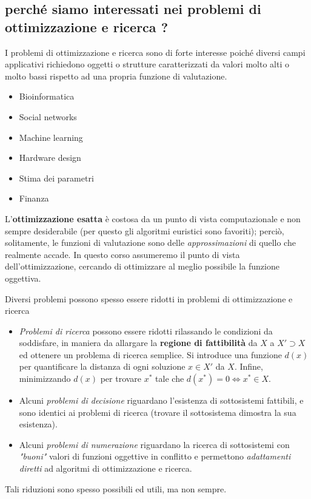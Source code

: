 \documentclass{article}
\begin{document}
\subsection{perché siamo interessati nei problemi di ottimizzazione e ricerca ?}

I problemi di ottimizzazione e ricerca sono di forte interesse poiché diversi campi applicativi richiedono oggetti o strutture caratterizzati da valori molto alti o molto bassi rispetto ad una propria funzione di valutazione.
\begin{itemize}
    \item Bioinformatica
    \item Social networks
    \item Machine learning
    \item Hardware design
    \item Stima dei parametri
    \item Finanza
\end{itemize}

L'\textbf{ottimizzazione esatta} è costosa da un punto di vista computazionale e non sempre desiderabile (per questo gli algoritmi euristici sono favoriti);
perciò, solitamente, le funzioni di valutazione sono delle \textit{approssimazioni} di quello che realmente accade. In questo corso assumeremo il punto di vista dell'ottimizzazione, cercando di ottimizzare al meglio possibile la funzione oggettiva.

Diversi problemi possono spesso essere ridotti in problemi di ottimizzazione e ricerca
\begin{itemize}
    \item \textit{Problemi di ricerca} possono essere ridotti rilassando le condizioni da soddisfare, in maniera da allargare la \textbf{regione di fattibilità}
          da $X$ a $X'\supset X$ ed ottenere un problema di ricerca semplice. Si introduce una funzione $d(x)$ per quantificare la distanza di ogni soluzione $x\in X'$ da $X$. Infine, minimizzando $d(x)$ per trovare $x^*$ tale che $d(x^*)=0 \Leftrightarrow x^* \in X$.
    \item Alcuni \textit{problemi di decisione} riguardano l'esistenza di sottosistemi fattibili, e sono identici ai problemi di
          ricerca (trovare il sottosistema dimostra la sua esistenza).
    \item Alcuni \textit{problemi di numerazione} riguardano la ricerca di sottosistemi con \textit{"buoni"} valori di funzioni oggettive in conflitto e permettono
          \textit{adattamenti diretti} ad algoritmi di ottimizzazione e ricerca.
\end{itemize}
Tali riduzioni sono spesso possibili ed utili, ma non sempre.
\end{document}
